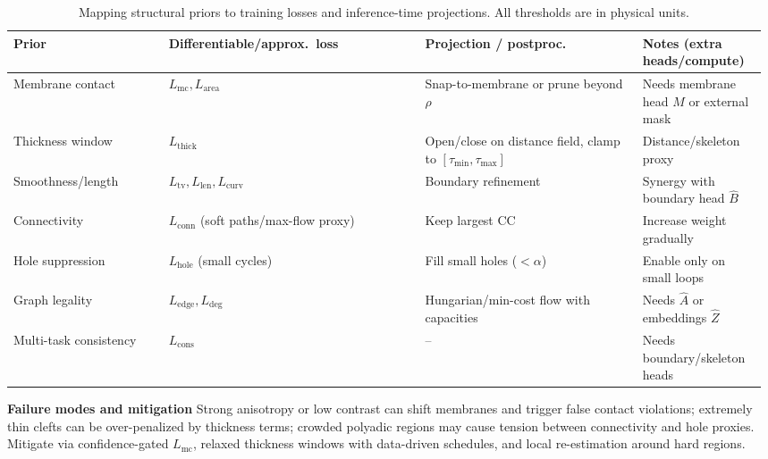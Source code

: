\medskip
\begin{table}[t]
  \centering
  \scriptsize
  \setlength{\tabcolsep}{2pt}\renewcommand{\arraystretch}{1.05}
  \begin{tabular}{@{} p{0.20\linewidth} p{0.33\linewidth} p{0.29\linewidth} p{0.16\linewidth} @{}}
    \hline
    \textbf{Prior} & \textbf{Differentiable/approx.\ loss} & \textbf{Projection / postproc.} & \textbf{Notes (extra heads/compute)} \\
    \hline
    Membrane contact & \(L_{\mathrm{mc}}, L_{\mathrm{area}}\) & Snap-to-membrane or prune beyond \(\rho\) & Needs membrane head \(M\) or external mask \\
    Thickness window & \(L_{\mathrm{thick}}\) & Open/close on distance field, clamp to \([\tau_{\min},\tau_{\max}]\) & Distance/skeleton proxy \\
    Smoothness/length & \(L_{\mathrm{tv}}, L_{\mathrm{len}}, L_{\mathrm{curv}}\) & Boundary refinement & Synergy with boundary head \(\hat B\) \\
    Connectivity & \(L_{\mathrm{conn}}\) (soft paths/max-flow proxy) & Keep largest CC & Increase weight gradually \\
    Hole suppression & \(L_{\mathrm{hole}}\) (small cycles) & Fill small holes (\(<\alpha\)) & Enable only on small loops \\
    Graph legality & \(L_{\mathrm{edge}}, L_{\mathrm{deg}}\) & Hungarian/min-cost flow with capacities & Needs \(\hat A\) or embeddings \(\hat Z\) \\
    Multi-task consistency & \(L_{\mathrm{cons}}\) & -- & Needs boundary/skeleton heads \\
    \hline
  \end{tabular}
  \caption{Mapping structural priors to training losses and inference-time projections. All thresholds are in physical units.}
  \label{tab:priors-mapping}
\end{table}

\medskip
\noindent\textbf{Failure modes and mitigation}\;
Strong anisotropy or low contrast can shift membranes and trigger false contact violations; extremely thin clefts can be over-penalized by thickness terms; crowded polyadic regions may cause tension between connectivity and hole proxies.
Mitigate via confidence-gated \(L_{\mathrm{mc}}\), relaxed thickness windows with data-driven schedules, and local re-estimation around hard regions.\par

